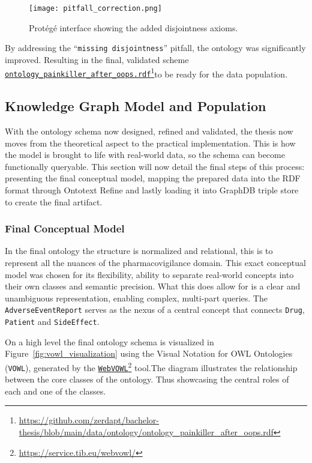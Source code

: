 \begin{figure}[H]
\centering
\texttt{[image: pitfall\_correction.png]} %
\caption{Protégé interface showing the added disjointness axioms.}
\label{fig:oops_correction}
\end{figure}

By addressing the “\texttt{missing disjointness}” pitfall, the ontology was significantly improved. Resulting in the final, validated scheme \href{https://github.com/zerdapt/bachelor-thesis/blob/main/data/ontology/ontology_painkiller_after_oops.rdf}{\nolinkurl{ontology_painkiller_after_oops.rdf}}\footnote{\url{https://github.com/zerdapt/bachelor-thesis/blob/main/data/ontology/ontology_painkiller_after_oops.rdf}}to be ready for the data population.

\subsection{Knowledge Graph Model and Population}
With the ontology schema now designed, refined and validated, the thesis now moves from the theoretical aspect to the practical implementation. This is how the model is brought to life with real-world data, so the schema can become functionally queryable. This section will now detail the final steps of this process: presenting the final conceptual model, mapping the prepared data into the RDF format through Ontotext Refine and lastly loading it into GraphDB triple store to create the final artifact. 
\subsubsection{Final Conceptual Model}
In the final ontology the structure is normalized and relational, this is to represent all the nuances of the pharmacovigilance domain. This exact conceptual model was chosen for its flexibility, ability to separate real-world concepts into their own classes and semantic precision. What this does allow for is a clear and unambiguous representation, enabling complex, multi-part queries. The \texttt{AdverseEventReport} serves as the nexus of a central concept that connects \texttt{Drug}, \texttt{Patient} and \texttt{SideEffect}.

On a high level the final ontology schema is visualized in Figure~\ref{fig:vowl_visualization} using the Visual Notation for OWL Ontologies (\texttt{VOWL}), generated by the \href{https://service.tib.eu/webvowl/}{\texttt{WebVOWL}}\footnote{\url{https://service.tib.eu/webvowl/}} tool.The diagram illustrates the relationship between the core classes of the ontology. Thus showcasing the central roles of each and one of the classes.


